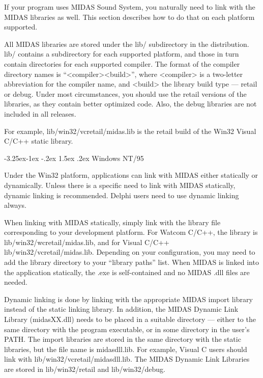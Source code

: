 \documentclass[a4paper,12pt,oneside]{book}
\makeatletter
\renewcommand\subsection{\@startsection{subsection}{2}{-20pt}%
                                     {-3.25ex\@plus -1ex \@minus -.2ex}%
                                     {1.5ex \@plus .2ex}%
                                     {\normalfont\large\bfseries}}
\newcommand{\mFileName}[1]{{\ttfamily #1}}
\makeatother
\begin{document}
If your program uses MIDAS Sound System, you naturally need to link with the
MIDAS libraries as well. This section describes how to do that on each
platform supported.

All MIDAS libraries are stored under the \mFileName{lib/} subdirectory
in the distribution. \mFileName{lib/} contains a subdirectory for each
supported platform, and those in turn contain directories for each
supported compiler. The format of the compiler directory names is
``<compiler><build>'', where <compiler> is a two-letter abbreviation for
the compiler name, and <build> the library build type --- retail or
debug. Under most circumstances, you should use the retail versions of
the libraries, as they contain better optimized code. Also, the debug
libraries are not included in all releases.

For example, \mFileName{lib/win32/vcretail/midas.lib} is the retail
build of the Win32 Visual C/C++ static library.


\subsection{Windows NT/95}

Under the Win32 platform, applications can link with MIDAS either statically
or dynamically. Unless there is a specific need to link with MIDAS
statically, dynamic linking is recommended. Delphi users need to use dynamic
linking always.

When linking with MIDAS statically, simply link with the library file
corresponding to your development platform. For Watcom C/C++, the
library is \mFileName{lib/win32/wcretail/midas.lib},
and for Visual C/C++ \mFileName{lib/win32/vcretail/midas.lib}. 
Depending on your configuration, you may need to add the library 
directory to your
``library paths'' list. When MIDAS is linked into the application
statically, the .exe is self-contained and no MIDAS \mFileName{.dll} files
are needed.

Dynamic linking is done by linking with the appropriate MIDAS import library
instead of the static linking library. In addition, the MIDAS Dynamic Link
Library (\mFileName{midasXX.dll}) needs to be placed in a suitable directory
--- either to the same directory with the program executable, or in some
directory in the user's PATH. The import libraries are stored in the
same directory with the static libraries, but the file name is
\mFileName{midasdll.lib}. For example, Visual C users should link with
\mFileName{lib/win32/vcretail/midasdll.lib}. The MIDAS Dynamic Link
Libraries are stored in \mFileName{lib/win32/retail} and
\mFileName{lib/win32/debug}.
\end{document}
